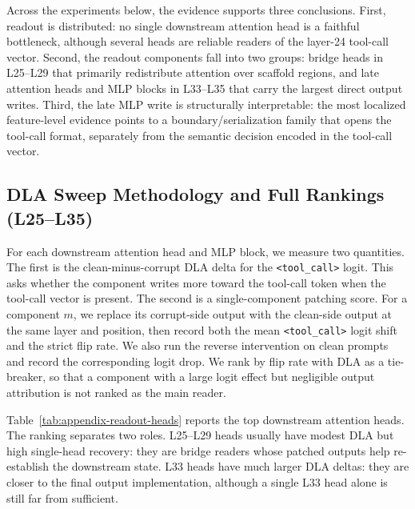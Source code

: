 Across the experiments below, the evidence supports three conclusions. First,
readout is distributed: no single downstream attention head is a faithful
bottleneck, although several heads are reliable readers of the layer-24
tool-call vector. Second, the readout components fall into two groups: bridge
heads in L25--L29 that primarily redistribute attention over scaffold regions,
and late attention heads and MLP blocks in L33--L35 that carry the largest
direct output writes. Third, the late MLP write is structurally interpretable:
the most localized feature-level evidence points to a boundary/serialization
family that opens the tool-call format, separately from the semantic decision
encoded in the tool-call vector.

\subsection{DLA Sweep Methodology and Full Rankings (L25--L35)}
For each downstream attention head and MLP block, we measure two quantities.
The first is the clean-minus-corrupt DLA delta for the
\texttt{<tool\_call>} logit.  This asks whether the component writes more
toward the tool-call token when the tool-call vector is present.  The second
is a single-component patching score.  For a component $m$, we replace its
corrupt-side output with the clean-side output at the same layer and position,
then record both the mean \texttt{<tool\_call>} logit shift and the strict
flip rate.  We also run the reverse intervention on clean prompts and record
the corresponding logit drop.  We rank by flip rate with DLA as a tie-breaker, so that a component with a
large logit effect but negligible output attribution is not ranked as the
main reader.

Table~\ref{tab:appendix-readout-heads} reports the top downstream attention
heads.  The ranking separates two roles.  L25--L29 heads usually have modest
DLA but high single-head recovery: they are bridge readers whose patched
outputs help re-establish the downstream state.  L33 heads have much larger
DLA deltas: they are closer to the final output implementation, although a
single L33 head alone is still far from sufficient.


